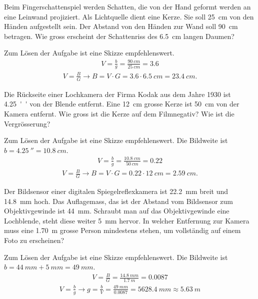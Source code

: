 \documentclass[12pt,a4paper,twoside]{article}
\begin{document}
\begin{aufgabe}
	Beim Fingerschattenspiel werden Schatten, die von der Hand geformt werden an eine Leinwand projiziert.
	Als Lichtquelle dient eine Kerze. Sie soll \SI{25}{cm} von den Händen aufgestellt sein. Der Abstand von
	den Händen zur Wand soll \SI{90}{cm} betragen. Wie gross erscheint der Schattenriss des \SI{6.5}{cm} langen Daumen?
	\begin{loesung}
		Zum Lösen der Aufgabe ist eine Skizze empfehlenswert.
		\begin{eqnarray*}
			V=\frac{b}{g}=\frac{\SI{90}{cm}}{\SI{25}{cm}}=\num{3.6}
		\end{eqnarray*}
		\begin{eqnarray*}
			V=\frac{B}{G}\to B=V\cdot G = \num{3.6}\cdot\SI{6.5}{cm}=\SI{23.4}{cm}\text{.}
		\end{eqnarray*}
	\end{loesung}
\end{aufgabe}

\begin{aufgabe}
	Die Rückseite einer Lochkamera der Firma Kodak aus dem Jahre 1930 ist \SI{4.25}{''} von der Blende entfernt.
	Eine \SI{12}{cm} grosse Kerze ist \SI{50}{cm} von der Kamera entfernt. Wie gross ist die Kerze auf dem Filmnegativ?
	Wie ist die Vergrösserung?
	\begin{loesung}
		Zum Lösen der Aufgabe ist eine Skizze empfehlenswert.
		Die Bildweite ist $b=\SI{4.25}{''}=\SI{10.8}{cm}$.
		\begin{eqnarray*}
			V=\frac{b}{g}=\frac{\SI{10.8}{cm}}{\SI{50}{cm}}=\num{0.22}
		\end{eqnarray*}
		\begin{eqnarray*}
			V=\frac{B}{G}\to B=V\cdot G = \num{0.22}\cdot\SI{12}{cm}=\SI{2.59}{cm}\text{.}
		\end{eqnarray*}
	\end{loesung}
\end{aufgabe}

\begin{aufgabe}
	Der Bildsensor einer digitalen Spiegelreflexkamera ist \SI{22,2}{mm} breit und \SI{14,8}{mm} hoch.
	Das Auflagemass, das ist der Abstand vom Bildsensor zum Objektivgewinde ist \SI{44}{mm}.
	Schraubt man auf das Objektivgewinde eine Lochblende, steht diese weiter \SI{5}{mm} hervor.
	In welcher Entfernung zur Kamera muss eine \SI{1,70}{m} grosse Person mindestens stehen, um vollständig auf einem Foto zu erscheinen?
	\begin{loesung}
		Zum Lösen der Aufgabe ist eine Skizze empfehlenswert.
		Die Bildweite ist $b=\SI{44}{mm}+\SI{5}{mm}=\SI{49}{mm}$.
		\begin{eqnarray*}
			V=\frac{B}{G}=\frac{\SI{14.8}{mm}}{\SI{1.7}{m}}=\num{0.0087}
		\end{eqnarray*}
		\begin{eqnarray*}
			V=\frac{b}{g}\to g=\frac{b}{V}=\frac{\SI{49}{mm}}{\num{0.0087}}=\SI{5628.4}{mm} \approx\SI{5.63}{m}
		\end{eqnarray*}
	\end{loesung}
\end{aufgabe}
\end{document}

